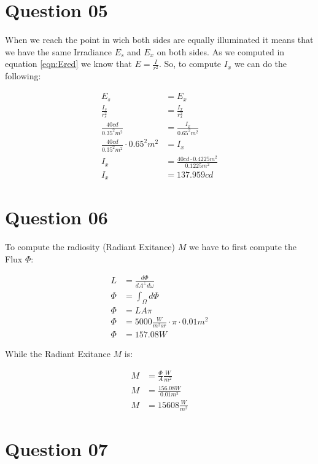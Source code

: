   \section{Question 05}
    
    When we reach the point in wich both sides are equally illuminated it means that we have the same Irradiance $E_s$ and $E_x$ on both sides.
    As we computed in equation \ref{eqn:Ered} we know that $E = \frac{I}{r^2}$. So, to compute $I_x$ we can do the following:

    \begin{align}
      E_s &= E_x \\
      \frac{I_s}{r_{s}^2} &= \frac{I_x}{r_{x}^2}      \\
      \frac{40cd}{0.35^2m^2} &= \frac{I_x}{0.65^2m^2} \\
      \frac{40cd}{0.35^2m^2} \cdot 0.65^2m^2 &= I_x   \\
      I_x &= \frac{40cd \cdot 0.4225 m^2}{0.1225m^2}  \\
      I_x &= 137.959 cd
    \end{align}

  \section{Question 06}

    To compute the radiosity (Radiant Exitance) $M$ we have to first compute the Flux $\Phi$:
    
    \begin{align}
      L &= \frac{d\Phi}{dA^{\perp}d\omega}        \\
      \Phi &= \int_{\Omega}^{}d\Phi   \\
      \Phi &= LA\pi                   \\
      \Phi &= 5000 \frac{W}{m^2 sr} \cdot \pi \cdot 0.01 m^2 \\
      \Phi &= 157.08 W
    \end{align}

    While the Radiant Exitance $M$ is:

    \begin{align}
      M &= \frac{\Phi}{A}\frac{W}{m^2}  \\
      M &= \frac{156.08 W}{0.01 m^2}    \\
      M &= 15608 \frac{W}{m^2}
    \end{align}

  \section{Question 07}

